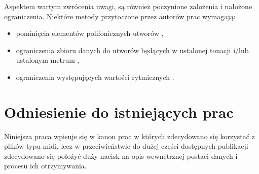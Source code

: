 {{    Aspektem wartym zwrócenia uwagi, są również poczynione założenia i nałożone
    ograniczenia. Niektóre metody przytoczone przez autorów prac wymagają:
    \begin{itemize}
      \setlength\itemsep{-0.5em}
      \item pominięcia elementów polifonicznych utworów \cite{Hadjeres2016DeepBachAS, Sturm2015FolkMS},
      \item ograniczenia zbioru danych do utworów będących w 
      ustalonej tonacji i/lub ustalonym metrum \cite{Sturm2015FolkMS, Wu2017AHR},
      \item ograniczenia występujących wartości rytmicznych \cite{Hadjeres2016DeepBachAS}.
    \end{itemize}
  }

  \section{Odniesienie do istniejących prac}
  {






    Niniejsza praca wpisuje się w kanon prac w których zdecydowano się korzystać z plików typu midi,
    lecz w przeciwieństwie do dużej części dostępnych publikacji zdecydowano się położyć duży nacisk
    na opis wewnętrznej postaci danych i procesu ich otrzymywania. 
    
}}
